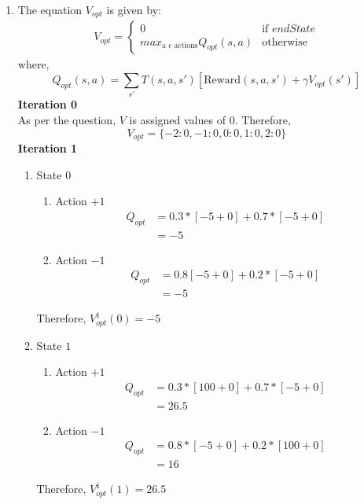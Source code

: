 \documentclass[12pt]{article}
\begin{document}
\begin{enumerate}[label=(\alph*)]
  \item 
  The equation $V_{opt}$  is given by: \\
  \begin{align*}
  V_{opt} = \begin{cases} 
  0 & \text{if $endState$} \\
  max_{\text{a } \epsilon \text{ actions}} Q_{opt}(s, a) & \text{otherwise}
  \end{cases}
  \end{align*}
  where,
  $$Q_{opt}(s, a) = \sum_{s'} T(s, a, s')[\text{Reward}(s, a, s') + \gamma V_{opt}(s')]$$
  \textbf{Iteration 0} \\
  As per the question, $V$ is assigned values of $0$. Therefore,
  $$V_{opt} = \{-2: 0, -1: 0, 0: 0, 1: 0, 2: 0\}$$
 \textbf{Iteration 1}
 \begin{enumerate}
 	\item State $0$ \\
 	\begin{enumerate}
 		\item Action $+1$ \\
 		\begin{align*}
 		Q_{opt} &= 0.3 * [-5 + 0] + 0.7 * [-5 + 0] \\
 		&= -5
 		\end{align*}
 		\item Action $-1$ \\
 		\begin{align*}
 		Q_{opt} &= 0.8 [-5 + 0] + 0.2 * [-5 + 0] \\
 		&= -5
 		\end{align*}
 	\end{enumerate}
 	Therefore, $V_{opt}^1(0) = -5$
 	\item State $1$ \\
 	\begin{enumerate}
 		\item Action $+1$
 		\begin{align*}
 		Q_{opt} &= 0.3 * [100 + 0] + 0.7 * [-5 + 0] \\
 		&= 26.5
 		\end{align*}
 		\item Action $-1$
 		\begin{align*}
 		Q_{opt} &= 0.8 * [-5 + 0] + 0.2 * [100 + 0] \\
 		&= 16
 		\end{align*}
 	\end{enumerate}
 	Therefore, $V_{opt}^1(1) = 26.5$

\end{enumerate}
\end{enumerate}
\end{document}
